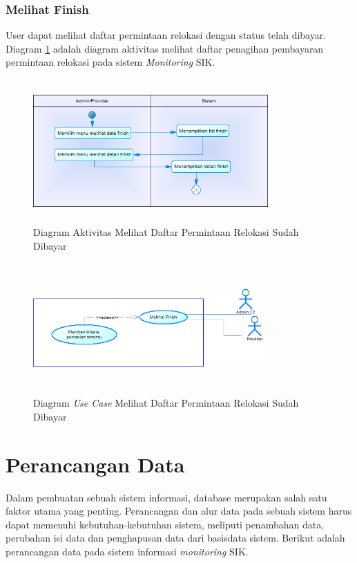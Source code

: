 	\subsubsection{Melihat Finish}
	User dapat melihat daftar permintaan relokasi dengan status telah dibayar. Diagram \ref{figure:activity_melihat_finish} adalah diagram aktivitas melihat daftar penagihan pembayaran permintaan relokasi pada sistem \textit{Monitoring} SIK.
	\begin{figure}[h]
	\centerline {\includegraphics[width=9cm,height=5.5cm]{bab4/ActivityDiagram_MelihatFinish.png}}
	\caption{Diagram Aktivitas Melihat Daftar Permintaan Relokasi Sudah Dibayar}
	\label{figure:activity_melihat_finish}
	\end{figure}

	\begin{figure}[h!]
	\centerline
	{\includegraphics[width=9cm,height=5cm]{bab4/use-case-melihat-finish.png}}
	\caption{Diagram \textit{Use Case} Melihat Daftar Permintaan Relokasi Sudah Dibayar}
	\label{figure:use_case_melihat_finish}
	\end{figure}
	
\newpage
\section{Perancangan Data}
\tab Dalam pembuatan sebuah sistem informasi, database merupakan salah satu faktor utama yang penting. Perancangan dan alur data pada sebuah sistem harus dapat memenuhi kebutuhan-kebutuhan sistem, meliputi penambahan data, perubahan isi data dan penghapusan data dari basisdata sistem. Berikut adalah perancangan data pada sistem informasi \textit{monitoring} SIK.

